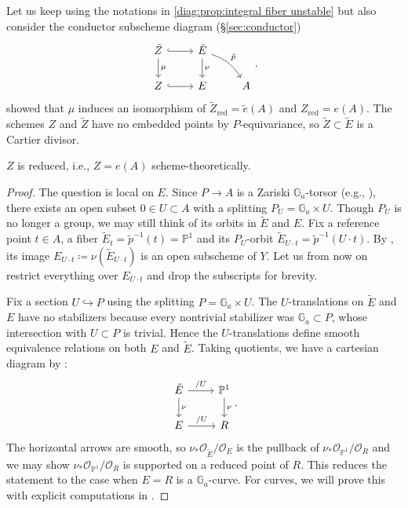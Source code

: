 \documentclass[reqno, letterpaper]{amsart}
\numberwithin{equation}{subsection}
\let\to\longrightarrow
\newcommand{\GG}{\mathbb{G}}
\newcommand{\PP}{\mathbb{P}}
\DeclareMathOperator{\red}{red}
\begin{document}
			Let us keep using the notations in \eqref{diag:prop:integral fiber unstable} but also consider the conductor subscheme diagram (\S \ref{sec:conductor})
			\begin{equation} \label{diag:prop:integral fiber unstable 2}
				\begin{tikzcd}
					\tilde Z \arrow[r, hook] \arrow[d, "\mu"] & \tilde E \arrow[d, "\nu"] \arrow[rd, bend left=20, "\tilde p"] \\
					Z \arrow[r, hook] & E & A
				\end{tikzcd}.
			\end{equation}
			 showed that $\mu$ induces an isomorphism of $\tilde Z_{\red} = \tilde e(A)$ and $Z_{\red} = e(A)$. The schemes $Z$ and $\tilde Z$ have no embedded points by $P$-equivariance, so $\tilde Z \subset \tilde E$ is a Cartier divisor.
			
			\begin{lemma} \label{lem:prop:integral fiber unstable step 2}
				$Z$ is reduced, i.e., $Z = e(A)$ scheme-theoretically.
			\end{lemma}
			\begin{proof}
				The question is local on $E$. Since $P \to A$ is a Zariski $\GG_a$-torsor (e.g., \cite[Proposition~16.55]{milne:group}), there exists an open subset $0 \in U \subset A$ with a splitting $P_U = \GG_a \times U$. Though $P_U$ is no longer a group, we may still think of its orbits in $\tilde E$ and $E$. Fix a reference point $t \in A$, a fiber $\tilde E_t = \tilde p^{-1}(t) = \PP^1$ and its $P_U$-orbit $\tilde E_{U \cdot t} = \tilde p^{-1}(U \cdot t)$. By , its image $E_{U \cdot t} \coloneq \nu(\tilde E_{U \cdot t})$ is an open subscheme of $Y$. Let us from now on restrict everything over $E_{U \cdot t}$ and drop the subscripts for brevity.
				
				Fix a section $U \hookrightarrow P$ using the splitting $P = \GG_a \times U$. The $U$-translations on $\tilde E$ and $E$ have no stabilizers because every nontrivial stabilizer was $\GG_a \subset P$, whose intersection with $U \subset P$ is trivial. Hence the $U$-translations define smooth equivalence relations on both $E$ and $\tilde E$. Taking quotients, we have a cartesian diagram by \cite[Tag~06PH and 04S6]{stacks-project}:
				\[\begin{tikzcd}[column sep=normal]
					\tilde E \arrow[r, "/U"] \arrow[d, "\nu"] & \PP^1 \arrow[d, "\nu"] \\
					E \arrow[r, "/U"] & R
				\end{tikzcd}.\]
				The horizontal arrows are smooth, so $\nu_* \mathcal O_{\tilde E}/\mathcal O_E$ is the pullback of $\nu_* \mathcal O_{\PP^1} / \mathcal O_R$ and we may show $\nu_* \mathcal O_{\PP^1} / \mathcal O_R$ is supported on a reduced point of $R$. This reduces the statement to the case when $E = R$ is a $\GG_a$-curve. For curves, we will prove this with explicit computations in .
			\end{proof}
			
\end{document}
